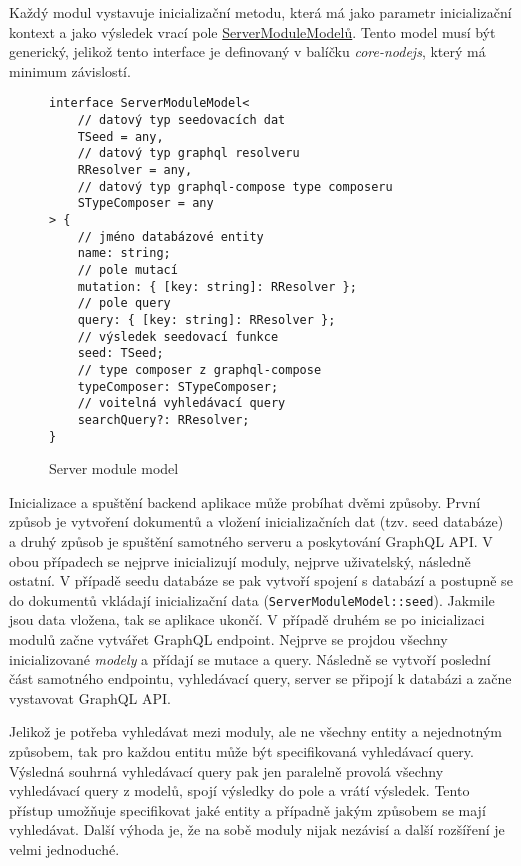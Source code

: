 Každý modul vystavuje inicializační metodu, která má jako parametr inicializační kontext a jako výsledek vrací pole \hyperref[code:server_module_model]{ServerModuleModelů}. Tento model musí být generický, jelikož tento interface je definovaný v balíčku \emph{core-nodejs}, který má minimum závislostí.

\begin{figure}[h!]
    \centering
    \begin{verbatim}
interface ServerModuleModel<
    // datový typ seedovacích dat    
    TSeed = any,
    // datový typ graphql resolveru
    RResolver = any,
    // datový typ graphql-compose type composeru
    STypeComposer = any
> {
    // jméno databázové entity    
    name: string;
    // pole mutací
    mutation: { [key: string]: RResolver };
    // pole query
    query: { [key: string]: RResolver };
    // výsledek seedovací funkce
    seed: TSeed;
    // type composer z graphql-compose 
    typeComposer: STypeComposer;
    // voitelná vyhledávací query
    searchQuery?: RResolver;
}
    \end{verbatim}
    \caption{Server module model}
    \label{code:server_module_model}
\end{figure}

Inicializace a spuštění backend aplikace může probíhat dvěmi způsoby. První způsob je vytvoření dokumentů a vložení inicializačních dat (tzv. seed databáze) a druhý způsob je spuštění samotného serveru a poskytování GraphQL API. V obou případech se nejprve inicializují moduly, nejprve uživatelský, následně ostatní. V případě seedu databáze se pak vytvoří spojení s databází a postupně se do dokumentů vkládají inicializační data (\texttt{ServerModuleModel::seed}). Jakmile jsou data vložena, tak se aplikace ukončí. V případě druhém se po inicializaci modulů začne vytvářet GraphQL endpoint. Nejprve se projdou všechny inicializované \emph{modely} a přídají se mutace a query. Následně se vytvoří poslední část samotného endpointu, vyhledávací query, server se připojí k databázi a začne vystavovat GraphQL API.

Jelikož je potřeba vyhledávat mezi moduly, ale ne všechny entity a nejednotným způsobem, tak pro každou entitu může být specifikovaná vyhledávací query. Výsledná souhrná vyhledávací query pak jen paralelně provolá všechny vyhledávací query z modelů, spojí výsledky do pole a vrátí výsledek. Tento přístup umožňuje specifikovat jaké entity a případně jakým způsobem se mají vyhledávat. Další výhoda je, že na sobě moduly nijak nezávisí a další rozšíření je velmi jednoduché.
